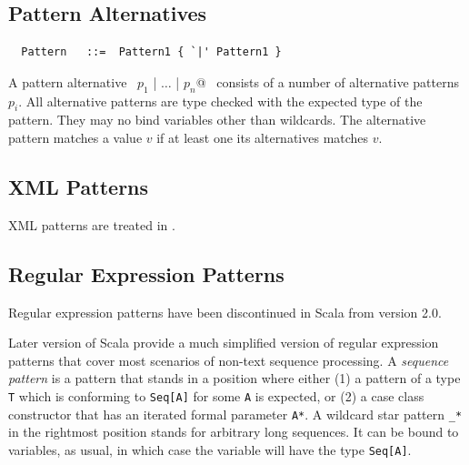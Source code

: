 \subsection{Pattern Alternatives}

\syntax\begin{lstlisting}
  Pattern   ::=  Pattern1 { `|' Pattern1 }
\end{lstlisting}

A pattern alternative ~\lstinline@$p_1$ | $\ldots$ | $p_n$@~
consists of a number of alternative patterns $p_i$. All alternative
patterns are type checked with the expected type of the pattern. They
may no bind variables other than wildcards. The alternative pattern 
matches a value $v$ if at least one its alternatives matches $v$.

\subsection{XML Patterns}

XML patterns are treated in .

\subsection{Regular Expression Patterns}\label{sec:reg-pats}

Regular expression patterns have been discontinued in Scala from version 2.0.

Later version of Scala provide a much simplified version of regular
expression patterns that cover most scenarios of non-text sequence
processing.  A {\em sequence pattern} is a pattern that stands in a
position where either (1) a pattern of a type \lstinline+T+ which is
conforming to
\lstinline+Seq[A]+ for some \lstinline+A+ is expected, or (2) a case
class constructor that has an iterated formal parameter
\lstinline+A*+.  A wildcard star pattern \lstinline+_*+ in the
rightmost position stands for arbitrary long sequences. It can be
bound to variables, as usual, in which case the variable will have the
type \lstinline+Seq[A]+.

